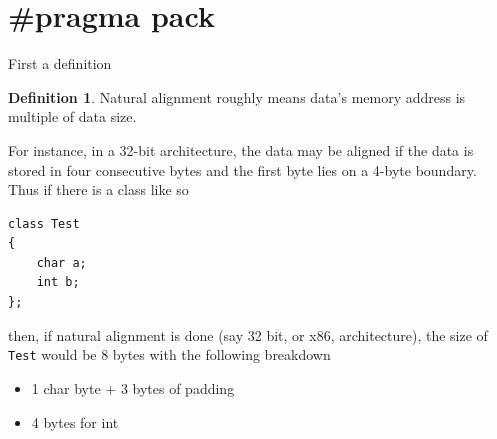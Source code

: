 \documentclass{article}
\theoremstyle{definition}
\newtheorem{definition}{Definition}[section]
\begin{document}
\section{\#pragma pack}
\label{append:pragma_pack}
First a definition

\begin{definition}
Natural alignment roughly means data's memory address is multiple of data size.
\end{definition}

For instance, in a 32-bit architecture, the data may be aligned if the data is stored in four consecutive bytes and the first byte lies on a 4-byte boundary.  
Thus if there is a class like so

\begin{lstlisting}[frame=single]
class Test
{
    char a;
    int b;
};
\end{lstlisting}

then, if natural alignment is done (say 32 bit, or x86, architecture), the size of \texttt{Test} would be 8 bytes with the following breakdown
\begin{itemize}
\item 1 char byte + 3 bytes of padding
\item 4 bytes for int
\end{itemize}
\end{document}
